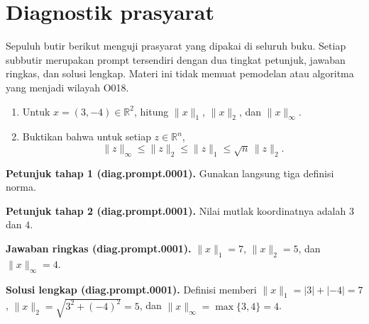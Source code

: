 
\section{Diagnostik prasyarat}
\label{orig03:section:diagnostik}

Sepuluh butir berikut menguji prasyarat yang dipakai di seluruh buku. Setiap
subbutir merupakan prompt tersendiri dengan dua tingkat petunjuk, jawaban
ringkas, dan solusi lengkap. Materi ini tidak memuat pemodelan atau algoritma
yang menjadi wilayah O018.

\begin{exercise}
\label{orig03:diag:problem:0001}
\begin{enumerate}
\item\label{orig03:diag:prompt:0001}
Untuk $x=(3,-4)\in\mathbb{R}^2$, hitung $\lVert x\rVert_1$,
$\lVert x\rVert_2$, dan $\lVert x\rVert_\infty$.
\item\label{orig03:diag:prompt:0002}
Buktikan bahwa untuk setiap $z\in\mathbb{R}^n$,
\[
  \lVert z\rVert_\infty\leq\lVert z\rVert_2
  \leq\lVert z\rVert_1\leq\sqrt n\,\lVert z\rVert_2.
\]
\end{enumerate}
\end{exercise}

\par\noindent\textbf{Petunjuk tahap 1 (diag.prompt.0001).}
Gunakan langsung tiga definisi norma.
\label{orig03:diag:hint1:0001}
\par\noindent\textbf{Petunjuk tahap 2 (diag.prompt.0001).}
Nilai mutlak koordinatnya adalah $3$ dan $4$.
\label{orig03:diag:hint2:0001}
\par\noindent\textbf{Jawaban ringkas (diag.prompt.0001).}
$\lVert x\rVert_1=7$, $\lVert x\rVert_2=5$, dan
$\lVert x\rVert_\infty=4$.
\label{orig03:diag:answer:0001}
\par\noindent\textbf{Solusi lengkap (diag.prompt.0001).}
Definisi memberi
$\lVert x\rVert_1=|3|+|-4|=7$,
$\lVert x\rVert_2=\sqrt{3^2+(-4)^2}=5$, dan
$\lVert x\rVert_\infty=\max\{3,4\}=4$.
\label{orig03:diag:solution:0001}

